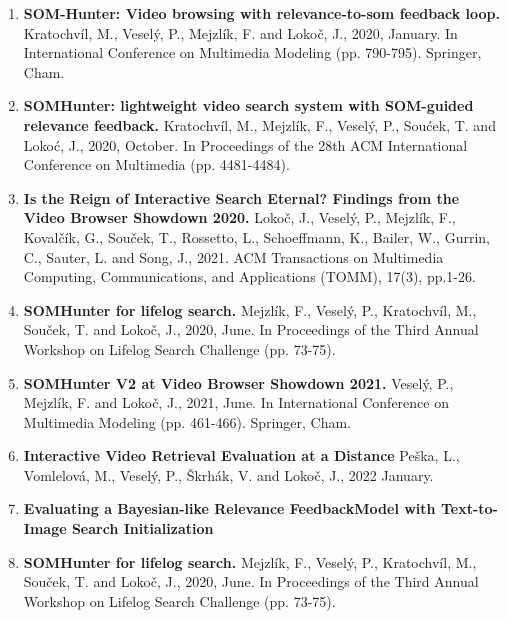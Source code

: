 \begin{enumerate}
	\item \textbf{SOM-Hunter: Video browsing with relevance-to-som feedback loop.} Kratochvíl, M., Veselý, P., Mejzlík, F. and Lokoč, J., 2020, January. In International Conference on Multimedia Modeling (pp. 790-795). Springer, Cham.
	\item \textbf{SOMHunter: lightweight video search system with SOM-guided relevance feedback.} Kratochvíl, M., Mejzlík, F., Veselý, P., Soućek, T. and Lokoć, J., 2020, October. In Proceedings of the 28th ACM International Conference on Multimedia (pp. 4481-4484).
	\item \textbf{Is the Reign of Interactive Search Eternal? Findings from the Video Browser Showdown 2020.} Lokoč, J., Veselý, P., Mejzlík, F., Kovalčík, G., Souček, T., Rossetto, L., Schoeffmann, K., Bailer, W., Gurrin, C., Sauter, L. and Song, J., 2021.  ACM Transactions on Multimedia Computing, Communications, and Applications (TOMM), 17(3), pp.1-26.
	\item \textbf{SOMHunter for lifelog search.} Mejzlík, F., Veselý, P., Kratochvíl, M., Souček, T. and Lokoč, J., 2020, June. In Proceedings of the Third Annual Workshop on Lifelog Search Challenge (pp. 73-75).
	\item \textbf{SOMHunter V2 at Video Browser Showdown 2021.} Veselý, P., Mejzlík, F. and Lokoč, J., 2021, June. In International Conference on Multimedia Modeling (pp. 461-466). Springer, Cham.
	\item \textbf{Interactive Video Retrieval Evaluation at a Distance} Peška, L., Vomlelová, M., Veselý, P., Škrhák, V. and Lokoč, J., 2022 January.
	\item \textbf{Evaluating a Bayesian-like Relevance FeedbackModel with Text-to-Image Search Initialization} 
	\item \textbf{SOMHunter for lifelog search.} Mejzlík, F., Veselý, P., Kratochvíl, M., Souček, T. and Lokoč, J., 2020, June. In Proceedings of the Third Annual Workshop on Lifelog Search Challenge (pp. 73-75).
\end{enumerate}
